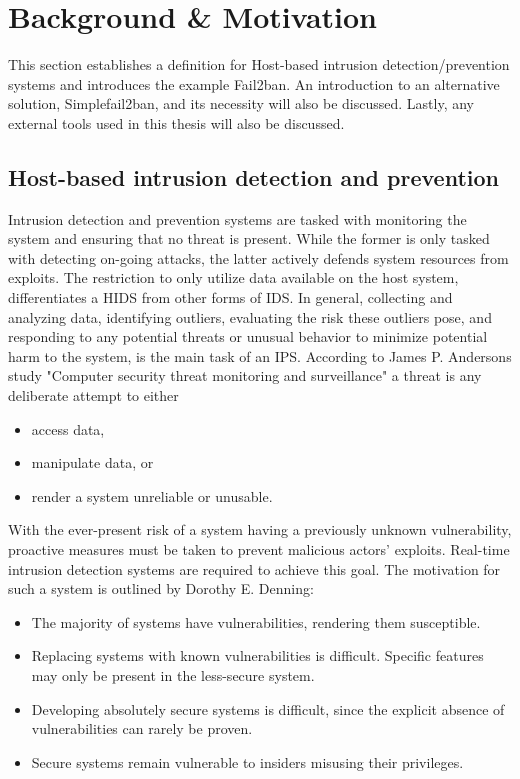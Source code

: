 %
%

\chapter{Background \& Motivation}
\label{cha:background}
This section establishes a definition for Host-based intrusion detection/prevention systems and introduces the example Fail2ban.
An introduction to an alternative solution, Simplefail2ban, and its necessity will also be discussed.
Lastly, any external tools used in this thesis will also be discussed. 

\section{Host-based intrusion detection and prevention}
Intrusion detection and prevention systems are tasked with monitoring the system and ensuring that no threat is present.
While the former is only tasked with detecting on-going attacks, the latter actively defends system resources from exploits.
The restriction to only utilize data available on the host system, differentiates a \ac{HIDS} from other forms of \ac{IDS}.
In general, collecting and analyzing data, identifying outliers, evaluating the risk these outliers pose, and responding to any potential threats or unusual behavior to minimize potential harm to the system, is the main task of an \ac{IPS}.
According to James P. Andersons study "Computer security threat monitoring and surveillance"\cite{anderson:compSec} a threat is any deliberate attempt to either
\begin{itemize}
    \itemsep0em
    \item access data,
    \item manipulate data, or
    \item render a system unreliable or unusable.
\end{itemize}

With the ever-present risk of a system having a previously unknown vulnerability, proactive measures must be taken to prevent malicious actors' exploits.
Real-time intrusion detection systems are required to achieve this goal.
The motivation for such a system is outlined by Dorothy E. Denning\cite{denning:IntrusionModel}:
\begin{itemize}
    \itemsep0em
    \item The majority of systems have vulnerabilities, rendering them susceptible. 
    \item Replacing systems with known vulnerabilities is difficult. Specific features may only be present in the less-secure system.
    \item Developing absolutely secure systems is difficult, since the explicit absence of vulnerabilities can rarely be proven.
    \item Secure systems remain vulnerable to insiders misusing their privileges.
\end{itemize}

